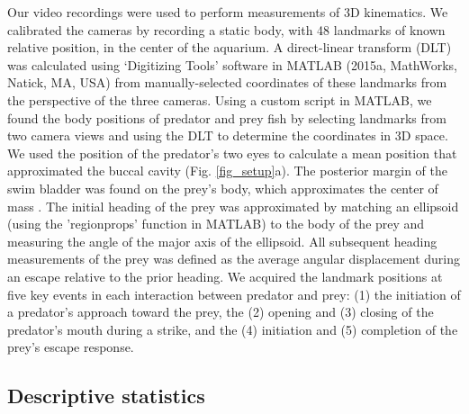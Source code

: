 \documentclass[]{rsos}%
\begin{document}
Our video recordings were used to perform measurements of 3D kinematics. 
We calibrated the cameras by recording a static body, with 48 landmarks of known relative position, in the center of the aquarium.
A direct-linear transform (DLT) was calculated using `Digitizing Tools' software in MATLAB (2015a, MathWorks, Natick, MA, USA) \cite{Hedrick:2008wz} from manually-selected coordinates of these landmarks from the perspective of the three cameras.
Using a custom script in MATLAB, we found the body positions of predator and prey fish by selecting landmarks from two camera views and using the DLT to determine the coordinates in 3D space.
We used the position of the predator's two eyes to calculate a mean position that approximated the buccal cavity (Fig. \ref{fig_setup}a).
The posterior margin of the swim bladder was found on the prey's body, which approximates the center of mass \cite{Stewart:2010ig}.
The initial heading of the prey was approximated by matching an ellipsoid (using the 'regionprops' function in MATLAB) to the body of the prey and measuring the angle of the major axis of the ellipsoid.
All subsequent heading measurements of the prey was defined as the average angular displacement during an escape relative to the prior heading.
We acquired the landmark positions at five key events in each interaction between predator and prey: (1) the initiation of a predator's approach toward the prey, the (2) opening and (3) closing of the predator's mouth during a strike, and the (4) initiation and (5) completion of the prey's escape response.


\subsection{Descriptive statistics}
\end{document}
